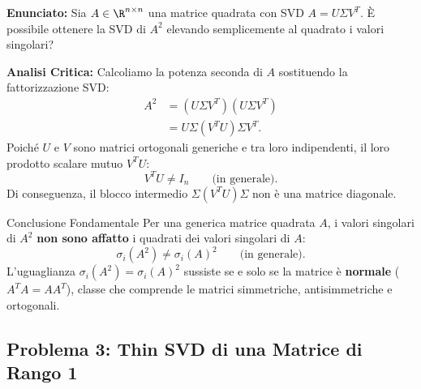 \begin{example}
\textbf{Enunciato:} Sia $A \in \R^{n \times n}$ una matrice quadrata con SVD $A = U \Sigma V^T$. \`E possibile ottenere la SVD di $A^2$ elevando semplicemente al quadrato i valori singolari?

\medskip
\textbf{Analisi Critica:}
Calcoliamo la potenza seconda di $A$ sostituendo la fattorizzazione SVD:
\begin{align}
    A^2 &= (U \Sigma V^T)(U \Sigma V^T) \nonumber \\
        &= U \Sigma (V^T U) \Sigma V^T.
\end{align}
Poich\'e $U$ e $V$ sono matrici ortogonali generiche e tra loro indipendenti, il loro prodotto scalare mutuo $V^T U$:
\begin{equation}
    V^T U \neq I_n \qquad \text{(in generale)}.
\end{equation}
Di conseguenza, il blocco intermedio $\Sigma (V^T U) \Sigma$ non \`e una matrice diagonale. 

\begin{alertblock}{Conclusione Fondamentale}
Per una generica matrice quadrata $A$, i valori singolari di $A^2$ \textbf{non sono affatto} i quadrati dei valori singolari di $A$:
\begin{equation}
    \sigma_i(A^2) \neq \sigma_i(A)^2 \qquad \text{(in generale)}.
\end{equation}
L'uguaglianza $\sigma_i(A^2) = \sigma_i(A)^2$ sussiste se e solo se la matrice \`e \textbf{normale} ($A^T A = A A^T$), classe che comprende le matrici simmetriche, antisimmetriche e ortogonali.
\end{alertblock}
\end{example}

\subsection{Problema 3: Thin SVD di una Matrice di Rango 1}

